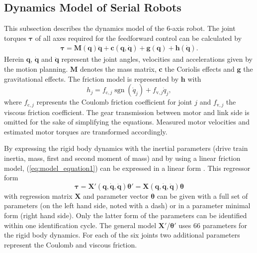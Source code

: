 
\subsection{Dynamics Model of Serial Robots}
This subsection describes the dynamics model of the 6-axis robot.
The joint torques $\boldsymbol{\tau}$ of all axes required for the feedforward control can be calculated by
%
\begin{equation}
\label{eq:model_equation1}
\begin{split}
\boldsymbol{\tau}=
\boldsymbol{M}(\boldsymbol{q}) \ddot{\boldsymbol{q}}+\boldsymbol{c}(\boldsymbol{q}, \dot{\boldsymbol{q}})+\boldsymbol{g}(\boldsymbol{q})+\boldsymbol{h}(\dot{\boldsymbol{q}}).
\end{split}
\end{equation}
%
Herein $\boldsymbol{q}$, $\dot{\boldsymbol{q}}$ and $\ddot{\boldsymbol{q}}$ represent the joint angles, velocities and accelerations given by the motion planning. $\boldsymbol{M}$ denotes the mass matrix, $\boldsymbol{c}$ the Coriolis effects and $\boldsymbol{g}$ the gravitational effects.
The friction model is represented by $\boldsymbol{h}$ with
%
\begin{equation}
h_{j}=f_{\mathrm{c}, j} \operatorname{sgn}\left(\dot{{q}}_{j}\right)+f_{\mathrm{v}, j} \dot{q}_{j},
\end{equation}
%
where $f_{\mathrm{c}, j}$ represents the Coulomb friction coefficient for joint $j$ and $f_{\mathrm{v}, j}$ the viscous friction coefficient. 
The gear transmission between motor and link side is omitted for the sake of simplifying the equations. Measured motor velocities and estimated motor torques are transformed accordingly.

By expressing the rigid body dynamics with the inertial parameters (drive train inertia, mass, first and second moment of mass) and by using a linear friction model, (\ref{eq:model_equation1}) can be expressed in a linear form \cite{Khalil.2006}.
%
This regressor form
%
\begin{equation}
\boldsymbol{\tau}
=
\boldsymbol{X}'(\boldsymbol{q}, \dot{\boldsymbol{q}},\ddot{\boldsymbol{q}}) \boldsymbol{\theta}'
=
\boldsymbol{X}(\boldsymbol{q}, \dot{\boldsymbol{q}},\ddot{\boldsymbol{q}}) \boldsymbol{\theta}
\label{eq:model_regressor}
\end{equation}
%
with regression matrix $\boldsymbol{X}$ and parameter vector $\boldsymbol{\theta}$
can be given with a full set of parameters (on the left hand side, noted with a dash) or in a parameter minimal form (right hand side).
Only the latter form of the parameters can be identified within one identification cycle.
The general model $\boldsymbol{X}'$/$\boldsymbol{\theta}'$ uses 66 parameters for the rigid body dynamics.
For each of the six joints two additional parameters represent the Coulomb and viscous friction.

